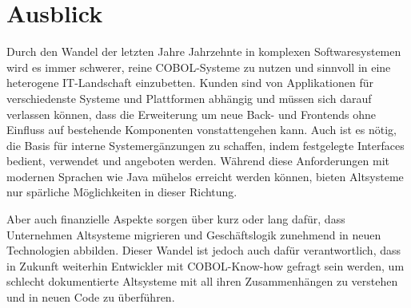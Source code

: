 \section{Ausblick}
Durch den Wandel der letzten Jahre \bzw Jahrzehnte in komplexen Softwaresystemen wird es immer schwerer, reine COBOL-Systeme zu nutzen und sinnvoll in eine heterogene IT-Landschaft einzubetten. Kunden sind von Applikationen für verschiedenste Systeme und Plattformen abhängig und müssen sich darauf verlassen können, dass die Erweiterung um neue Back- und Frontends ohne Einfluss auf bestehende Komponenten vonstattengehen kann. Auch ist es nötig, die Basis für interne Systemergänzungen zu schaffen, indem festgelegte Interfaces bedient, verwendet und angeboten werden. Während diese Anforderungen mit modernen Sprachen wie Java mühelos erreicht werden können, bieten Altsysteme nur spärliche Möglichkeiten in dieser Richtung.

Aber auch finanzielle Aspekte sorgen über kurz oder lang dafür, dass Unternehmen Altsysteme migrieren und Geschäftslogik zunehmend in neuen Technologien abbilden. Dieser Wandel ist jedoch auch dafür verantwortlich, dass in Zukunft weiterhin Entwickler mit COBOL-Know-how gefragt sein werden, um schlecht dokumentierte Altsysteme mit all ihren Zusammenhängen zu verstehen und in neuen Code zu überführen.

